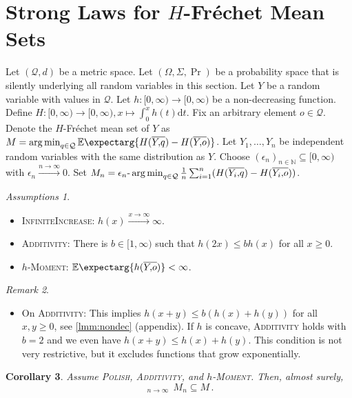 \documentclass{scrartcl}
\renewcommand{\subset}{\subseteq}
\newcommand{\Ex}{\E\expectarg}
\newcommand*{\mc}[1]{\mathcal{#1}}
\newcommand{\N}{\mathbb{N}}
\newcommand{\dl}{\mathrm{d}}
\newcommand{\equationFullstop}{\, .}
\newcommand{\eqfs}{\equationFullstop}
\DeclareMathOperator*{\argmin}{arg\,min}
\DeclareMathOperator*{\outerlim}{lim\, \overline{sup}}
\theoremstyle{plain}\newtheorem{theorem}{Theorem}[section]
\newtheorem{corollary}[theorem]{Corollary}
\theoremstyle{definition}
\theoremstyle{remark}
\newtheorem{remark}[theorem]{Remark}
\newtheorem{assumptions}[theorem]{Assumptions}
\begin{document}
 \section{Strong Laws for $H$-Fréchet Mean Sets}\label{sec:nondec}
Let $(\mc Q, d)$ be a metric space. Let $(\Omega, \Sigma, \Pr)$ be a probability space that is silently underlying all random variables in this section. Let $Y$ be a random variable with values in $\mc Q$.
Let $h \colon [0,\infty) \to [0,\infty)$ be a non-decreasing function.
Define $H \colon [0,\infty) \to [0,\infty), x\mapsto \int_0^x h(t) \dl t$.
Fix an arbitrary element $o\in\mc Q$. Denote the $H$-Fréchet mean set of $Y$ as $M = \argmin_{q\in\mc Q} \Ex{H(\ol Yq) - H(\ol Yo)}$.
Let $Y_1, \dots, Y_n$ be independent random variables with the same distribution as $Y$.
Choose $(\epsilon_n)_{n\in\N}\subset [0,\infty)$ with $\epsilon_n \xrightarrow{n\to\infty}0$. Set $M_n = \epsilon_n\text{-}\argmin_{q\in\mc Q} \frac{1}n \sum_{i=1}^n (H(\ol {Y_i}q) - H(\ol {Y_i}o))$.
\begin{assumptions}\mbox{ }
	\begin{itemize}
	\item \textsc{InfiniteIncrease}:
		$h(x) \xrightarrow{x\to\infty} \infty$.
	\item \textsc{Additivity}:
		There is $b \in [1,\infty)$ such that $h(2x) \leq b h(x)$ for all $x \geq 0$.
	\item \textsc{$h$-Moment}: 
		$\Ex{h(\ol Yo)} < \infty$.
	\end{itemize}
\end{assumptions}
\begin{remark}\mbox{ }
\begin{itemize}
\item On \textsc{Additivity}:
	This implies $h(x+y)\leq b(h(x) + h(y))$ for all $x,y\geq 0$, see \autoref{lmm:nondec} (appendix).
	If $h$ is concave, \textsc{Additivity} holds with $b=2$ and we even have $h(x+y)\leq h(x) + h(y)$.
	This condition is not very restrictive, but it excludes functions that grow exponentially.
\end{itemize}
\end{remark}
\begin{corollary}\label{cor:nondec:epi}
	Assume \textsc{Polish}, \textsc{Additivity}, and \textsc{$h$-Moment}.
	Then, almost surely, 
	\begin{equation*}
		\outerlim_{n\to\infty}\, M_n \subset M
		\eqfs
	\end{equation*}
\end{corollary}
\end{document}
